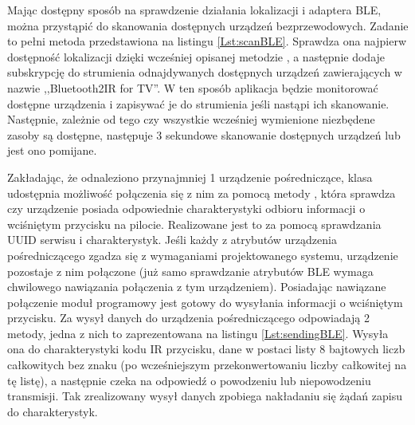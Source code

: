 \documentclass[12pt,twoside]{article}
\begin{document}
\begin{figure}[!ht]

\end{figure}

Mając dostępny sposób na sprawdzenie działania lokalizacji i adaptera BLE, można przystąpić do skanowania dostępnych urządzeń bezprzewodowych. Zadanie to pełni metoda przedstawiona na listingu \ref*{Lst:scanBLE}. Sprawdza ona najpierw dostępność lokalizacji dzięki wcześniej opisanej metodzie , a następnie dodaje subskrypcję do strumienia odnajdywanych dostępnych urządzeń zawierających w nazwie ,,Bluetooth2IR for TV''. W ten sposób aplikacja będzie monitorować dostępne urządzenia i zapisywać je do strumienia jeśli nastąpi ich skanowanie. Następnie, zależnie od tego czy wszystkie wcześniej wymienione niezbędene zasoby są dostępne, następuje 3 sekundowe skanowanie dostępnych urządzeń lub jest ono pomijane.

\begin{figure}[!ht]

\end{figure}

Zakładając, że odnaleziono przynajmniej 1 urządzenie pośredniczące, klasa udostępnia możliwość połączenia się z nim za pomocą metody , która sprawdza czy urządzenie posiada odpowiednie charakterystyki odbioru informacji o wciśniętym przycisku na pilocie. Realizowane jest to za pomocą sprawdzania UUID serwisu i charakterystyk. Jeśli każdy z atrybutów urządzenia pośredniczącego zgadza się z wymaganiami projektowanego systemu, urządzenie pozostaje z nim połączone (już samo sprawdzanie atrybutów BLE wymaga chwilowego nawiązania połączenia z tym urządzeniem). Posiadając nawiązane połączenie moduł programowy jest gotowy do wysyłania informacji o wciśniętym przycisku. Za wysył danych do urządzenia pośredniczącego odpowiadają 2 metody, jedna z nich to  zaprezentowana na listingu \ref*{Lst:sendingBLE}. Wysyła ona do charakterystyki kodu IR przycisku, dane w postaci listy 8 bajtowych liczb całkowitych bez znaku (po wcześniejszym przekonwertowaniu liczby całkowitej na tę listę), a następnie czeka na odpowiedź o powodzeniu lub niepowodzeniu transmisji. Tak zrealizowany wysył danych zpobiega nakładaniu się żądań zapisu do charakterystyk.
\end{document}
